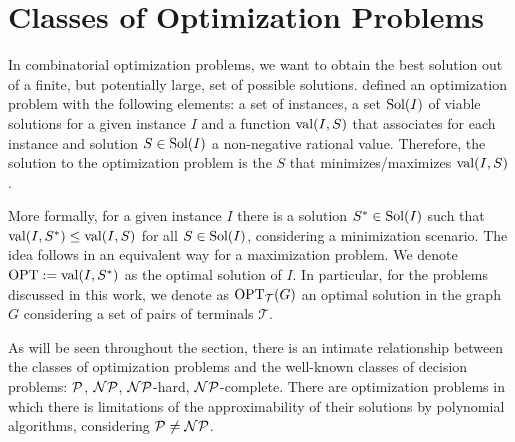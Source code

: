 \section{Classes of Optimization Problems}

In combinatorial optimization problems, we want to obtain the best solution out of a finite, but potentially large, set of possible solutions. \cite{livroAprox} defined an optimization problem with the following elements: a set of instances, a set \(\operatorname{\textrm{Sol}}(I)\) of viable solutions for a given instance \(I\) and a function \(\operatorname{\textrm{val}} (I, S)\) that associates for each instance and solution \(S \in \operatorname{\textrm{Sol}}(I)\) a non-negative rational value. Therefore, the solution to the optimization problem is the \(S\) that minimizes/maximizes \(\operatorname{\textrm{val}}(I, S)\).



More formally, for a given instance \(I\) there is a solution \(S^* \in \operatorname{\textrm{Sol}}(I)\) such that \(\operatorname{\textrm{val}}(I, S^*) \leq \operatorname{\textrm{val}}(I, S)\) for all \(S \in \operatorname{\textrm{Sol}}(I)\), considering a minimization scenario. The idea follows in an equivalent way for a maximization problem. We denote \(\operatorname{\textrm{OPT}} := \operatorname{\textrm{val}}(I, S^*)\) as the optimal solution of \(I\). In particular, for the problems discussed in this work, we denote as \(\operatorname{\textrm{OPT}}_{\mathcal{T}}(G)\) an optimal solution in the graph \(G\) considering a set of pairs of terminals \(\mathcal{T}\).


As will be seen throughout the section, there is an intimate relationship between the classes of optimization problems and the well-known classes of decision problems: \(\mathcal{P}\), \(\mathcal{NP}\), \(\mathcal{NP}\)-hard, \(\mathcal{NP}\)-complete. There are optimization problems in which there is limitations of the approximability of their solutions by polynomial algorithms, considering \(\mathcal{P} \neq \mathcal{NP}\).

